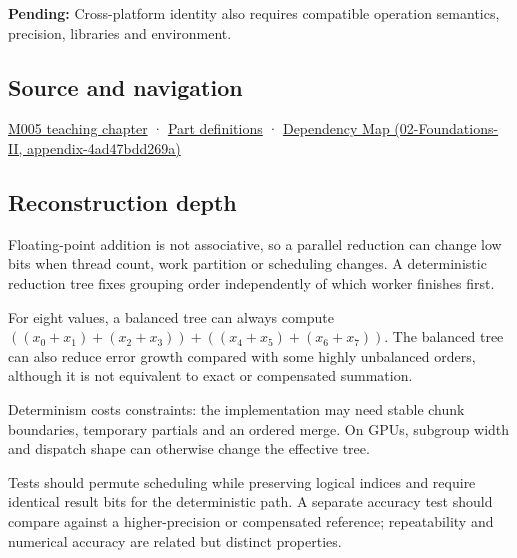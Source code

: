 \textbf{Pending:} Cross-platform identity also requires compatible operation semantics, precision, libraries and environment.

\subsection{Source and navigation}\label{appendix-4c8e0238e7ee-source-and-navigation}

\hyperref[01-foundations-i-ch001-when-arithmetic-meets-uncertainty]{M005 teaching chapter} · \hyperref[appendix-fd090d982a15-m005---parts-77-88]{Part definitions} · \href{../02-Foundations-II/main.pdf\#nameddest=appendix-4ad47bdd269a}{Dependency Map (02-Foundations-II, appendix-4ad47bdd269a)}

\subsection{Reconstruction depth}\label{appendix-4c8e0238e7ee-reconstruction-depth}

Floating-point addition is not associative, so a parallel reduction can change low bits when thread count, work partition or scheduling changes. A deterministic reduction tree fixes grouping order independently of which worker finishes first.

For eight values, a balanced tree can always compute \(((x_0+x_1)+(x_2+x_3)) + ((x_4+x_5)+(x_6+x_7))\). The balanced tree can also reduce error growth compared with some highly unbalanced orders, although it is not equivalent to exact or compensated summation.

Determinism costs constraints: the implementation may need stable chunk boundaries, temporary partials and an ordered merge. On GPUs, subgroup width and dispatch shape can otherwise change the effective tree.

Tests should permute scheduling while preserving logical indices and require identical result bits for the deterministic path. A separate accuracy test should compare against a higher-precision or compensated reference; repeatability and numerical accuracy are related but distinct properties.
